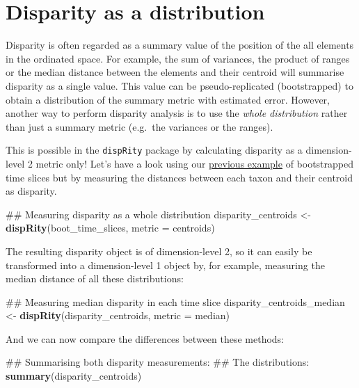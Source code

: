 \documentclass[]{book}
\newenvironment{Shaded}{\begin{snugshade}}{\end{snugshade}}
\newcommand{\KeywordTok}[1]{\textcolor[rgb]{0.13,0.29,0.53}{\textbf{#1}}}
\newcommand{\DataTypeTok}[1]{\textcolor[rgb]{0.13,0.29,0.53}{#1}}
\newcommand{\StringTok}[1]{\textcolor[rgb]{0.31,0.60,0.02}{#1}}
\newcommand{\NormalTok}[1]{#1}
\theoremstyle{definition}
\theoremstyle{definition}
\theoremstyle{remark}
\begin{document}
\hypertarget{disparity-as-a-distribution}{\section{Disparity as a
distribution}\label{disparity-as-a-distribution}}

Disparity is often regarded as a summary value of the position of the
all elements in the ordinated space. For example, the sum of variances,
the product of ranges or the median distance between the elements and
their centroid will summarise disparity as a single value. This value
can be pseudo-replicated (bootstrapped) to obtain a distribution of the
summary metric with estimated error. However, another way to perform
disparity analysis is to use the \emph{whole distribution} rather than
just a summary metric (e.g.~the variances or the ranges).

This is possible in the \texttt{dispRity} package by calculating
disparity as a dimension-level 2 metric only! Let's have a look using
our \protect\hyperlink{summarising-dispRity-data-plots}{previous
example} of bootstrapped time slices but by measuring the distances
between each taxon and their centroid as disparity.

\begin{Shaded}
\begin{Highlighting}[]
\NormalTok{## Measuring disparity as a whole distribution}
\NormalTok{disparity_centroids <-}\StringTok{ }\KeywordTok{dispRity}\NormalTok{(boot_time_slices, }\DataTypeTok{metric =}\NormalTok{ centroids)}
\end{Highlighting}
\end{Shaded}

The resulting disparity object is of dimension-level 2, so it can easily
be transformed into a dimension-level 1 object by, for example,
measuring the median distance of all these distributions:

\begin{Shaded}
\begin{Highlighting}[]
\NormalTok{## Measuring median disparity in each time slice}
\NormalTok{disparity_centroids_median <-}\StringTok{ }\KeywordTok{dispRity}\NormalTok{(disparity_centroids, }\DataTypeTok{metric =}\NormalTok{ median)}
\end{Highlighting}
\end{Shaded}

And we can now compare the differences between these methods:

\begin{Shaded}
\begin{Highlighting}[]
\NormalTok{## Summarising both disparity measurements:}
\NormalTok{## The distributions:}
\KeywordTok{summary}\NormalTok{(disparity_centroids)}
\end{Highlighting}
\end{Shaded}
\end{document}
